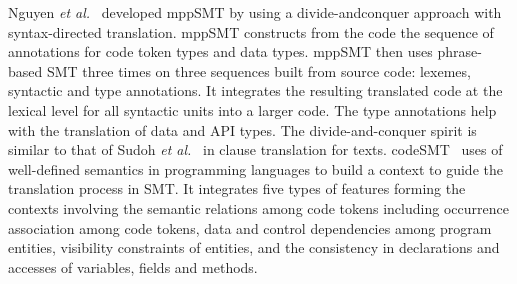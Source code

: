 Nguyen {\em et al.}~\cite{ase15} developed mppSMT by using a
divide-andconquer approach with syntax-directed translation. mppSMT
constructs from the code the sequence of annotations for code token
types and data types. mppSMT then uses phrase-based SMT three times on
three sequences built from source code: lexemes, syntactic and type
annotations. It integrates the resulting translated code at the
lexical level for all syntactic units into a larger code. The type
annotations help with the translation of data and API types.
The divide-and-conquer spirit is similar to that of Sudoh {\em et
  al.}~\cite{sudoh15} in clause translation for texts.
%
codeSMT~\cite{icsme16} uses of well-defined semantics in programming
languages to build a context to guide the translation process in
SMT. It integrates five types of features forming the contexts
involving the semantic relations among code tokens including
occurrence association among code tokens, data and control
dependencies among program entities, visibility constraints of
entities, and the consistency in declarations and accesses of
variables, fields and methods.







